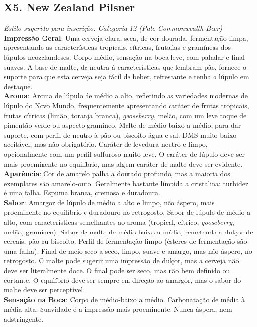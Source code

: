 \subsection*{X5. New Zealand Pilsner}

\textit{Estilo sugerido para inscrição: Categoria 12 (Pale Commonwealth Beer)}
\textbf{Impressão Geral}: Uma cerveja clara, seca, de cor dourada, fermentação limpa, apresentando as características tropicais, cítricas, frutadas e gramíneas dos lúpulos neozelandeses. Corpo médio, sensação na boca leve, com paladar e final suaves. A base de malte, de neutra à características que lembram pão, fornece o suporte para que esta cerveja seja fácil de beber, refrescante e tenha o lúpulo em destaque. \\
\textbf{Aroma}: Aroma de lúpulo de médio a alto, refletindo as variedades modernas de lúpulo do Novo Mundo, frequentemente apresentando caráter de frutas tropicais, frutas cítricas (limão, toranja branca), \textit{gooseberry}, melão, com um leve toque de pimentão verde ou aspecto gramíneo. Malte de médio-baixo a médio, para dar suporte, com perfil de neutro à pão ou biscoito água e sal. DMS muito baixo aceitável, mas não obrigatório. Caráter de levedura neutro e limpo, opcionalmente com um perfil sulfuroso muito leve. O caráter de lúpulo deve ser mais proeminente no equilíbrio, mas algum caráter de malte deve ser evidente. \\
\textbf{Aparência}: Cor de amarelo palha a dourado profundo, mas a maioria dos exemplares são amarelo-ouro. Geralmente bastante límpida a cristalina; turbidez é uma falha. Espuma branca, cremosa e duradoura. \\
\textbf{Sabor}: Amargor de lúpulo de médio a alto e limpo, não áspero, mais proeminente no equilíbrio e duradouro no retrogosto. Sabor de lúpulo de médio a alto, com características semelhantes ao aroma (tropical, cítrico, \textit{gooseberry}, melão, gramíneo). Sabor de malte de médio-baixo a médio, remetendo a dulçor de cereais, pão ou biscoito. Perfil de fermentação limpo (ésteres de fermentação são uma falha). Final de meio seco a seco, limpo, suave e amargo, mas não áspero, no retrogosto. O malte pode sugerir uma impressão de dulçor, mas a cerveja não deve ser literalmente doce. O final pode ser seco, mas não bem definido ou cortante. O equilíbrio deve ser sempre em direção ao amargor, mas o sabor do malte deve ser perceptível. \\
\textbf{Sensação na Boca}: Corpo de médio-baixo a médio. Carbonatação de média à média-alta. Suavidade é a impressão mais proeminente. Nunca áspera, nem adstringente. \\
